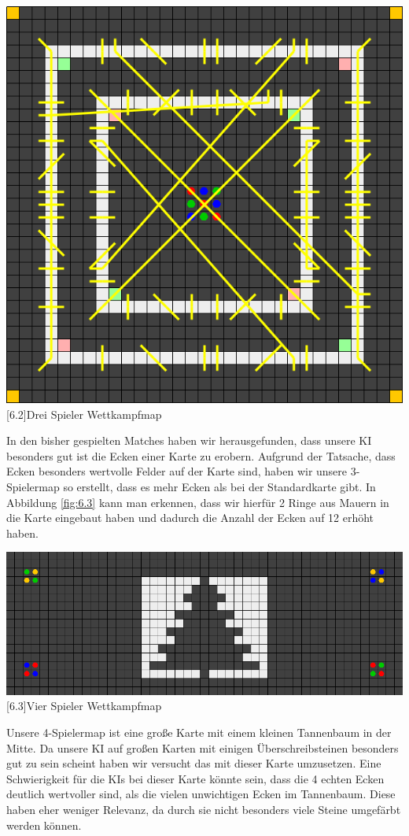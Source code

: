 \documentclass[12pt,a4paper,bibliography=totocnumbered,listof=totocnumbered]{scrartcl}
\begin{document}
	\vspace{1em}
	\begin{minipage}{\linewidth}
		\centering
		\includegraphics[width=0.66\linewidth]{pics/Kapitel_6/DreiSpielerKreise.png}
		[6.2]{Drei Spieler Wettkampfmap}
		\label{fig:6.2}
	\end{minipage}
	\vspace{1em}
	
	In den bisher gespielten Matches haben wir herausgefunden, dass unsere KI besonders gut ist die Ecken einer Karte zu erobern. Aufgrund der Tatsache, dass Ecken besonders wertvolle Felder auf der Karte sind, haben wir unsere 3-Spielermap so erstellt, dass es mehr Ecken als bei der Standardkarte gibt. In Abbildung \ref{fig:6.3} kann man erkennen, dass wir hierfür 2 Ringe aus Mauern in die Karte eingebaut haben und dadurch die Anzahl der Ecken auf 12 erhöht haben.
	
	\vspace{1em}
	\begin{minipage}{\linewidth}
		\centering
		\includegraphics[width=0.66\linewidth]{pics/Kapitel_6/TannenbaumMap.PNG}
		[6.3]{Vier Spieler Wettkampfmap}
		\label{fig:6.3}
	\end{minipage}
	\vspace{1em}
	
	Unsere 4-Spielermap ist eine große Karte mit einem kleinen Tannenbaum in der Mitte. Da unsere KI auf großen Karten mit einigen Überschreibsteinen besonders gut zu sein scheint haben wir versucht das mit dieser Karte umzusetzen. Eine Schwierigkeit für die KIs bei dieser Karte könnte sein, dass die 4 \glqq echten\grqq{} Ecken deutlich wertvoller sind, als die vielen \glqq unwichtigen \grqq{} Ecken im Tannenbaum. Diese haben eher weniger Relevanz, da durch sie nicht besonders viele Steine umgefärbt werden können.
	
\end{document}
